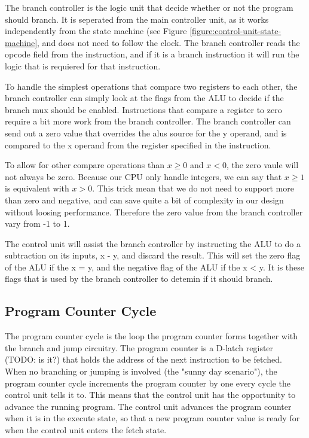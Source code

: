 The branch controller is the logic unit that decide whether or not the program should branch.
It is seperated from the main controller unit, as it works independently from the state machine (see Figure \ref{figure:control-unit-state-machine}, and does not need to follow the clock.
The branch controller reads the opcode field from the instruction, and if it is a branch instruction it will run the logic that is requiered for that instruction.

To handle the simplest operations that compare two registers to each other, the branch controller can simply look at the flags from the ALU to decide if the branch mux should be enabled.
Instructions that compare a register to zero require a bit more work from the branch controller.
The branch controller can send out a zero value that overrides the alus source for the y operand, and is compared to the x operand from the register specified in the instruction.

To allow for other compare operations than $x \geq 0$ and $x < 0$, the zero vaule will not always be zero. 
Because our CPU only handle integers, we can say that $x \geq 1$ is equivalent with $x > 0$.
This trick mean that we do not need to support more than zero and negative, and can save quite a bit of complexity in our design without loosing performance.
Therefore the zero value from the branch controller vary from -1 to 1.

The control unit will assist the branch controller by instructing the ALU to do a subtraction on its inputs, x - y, and discard the result.
This will set the zero flag of the ALU if the x = y, and the negative flag of the ALU if the x < y.
It is these flags that is used by the branch controller to detemin if it should branch.
\subsection{Program Counter Cycle}

The program counter cycle is the loop the program counter forms together with the branch and jump circuitry.
The program counter is a D-latch register (TODO: is it?) that holds the address of the next instruction to be fetched.
When no branching or jumping is involved (the "sunny day scenario"), the program counter cycle increments the program counter by one every cycle the control unit tells it to.
This means that the control unit has the opportunity to advance the running program.
The control unit advances the program counter when it is in the execute state, so that a new program counter value is ready for when the control unit enters the fetch state.

